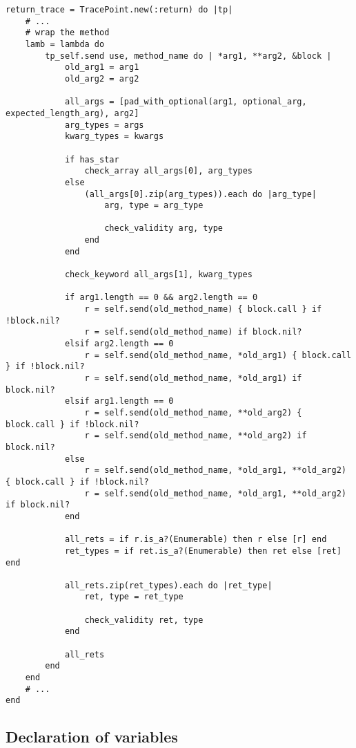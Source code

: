 \begin{lstlisting}
return_trace = TracePoint.new(:return) do |tp|
    # ...
    # wrap the method
    lamb = lambda do
        tp_self.send use, method_name do | *arg1, **arg2, &block |
            old_arg1 = arg1
            old_arg2 = arg2

            all_args = [pad_with_optional(arg1, optional_arg, expected_length_arg), arg2]
            arg_types = args
            kwarg_types = kwargs

            if has_star
                check_array all_args[0], arg_types
            else
                (all_args[0].zip(arg_types)).each do |arg_type|
                    arg, type = arg_type

                    check_validity arg, type
                end
            end

            check_keyword all_args[1], kwarg_types

            if arg1.length == 0 && arg2.length == 0
                r = self.send(old_method_name) { block.call } if !block.nil?
                r = self.send(old_method_name) if block.nil?
            elsif arg2.length == 0
                r = self.send(old_method_name, *old_arg1) { block.call } if !block.nil?
                r = self.send(old_method_name, *old_arg1) if block.nil?
            elsif arg1.length == 0
                r = self.send(old_method_name, **old_arg2) { block.call } if !block.nil?
                r = self.send(old_method_name, **old_arg2) if block.nil?
            else
                r = self.send(old_method_name, *old_arg1, **old_arg2) { block.call } if !block.nil?
                r = self.send(old_method_name, *old_arg1, **old_arg2) if block.nil?
            end

            all_rets = if r.is_a?(Enumerable) then r else [r] end
            ret_types = if ret.is_a?(Enumerable) then ret else [ret] end

            all_rets.zip(ret_types).each do |ret_type|
                ret, type = ret_type
                        
                check_validity ret, type
            end

            all_rets
        end
    end
    # ...
end

\end{lstlisting}

\subsection{Declaration of variables}

